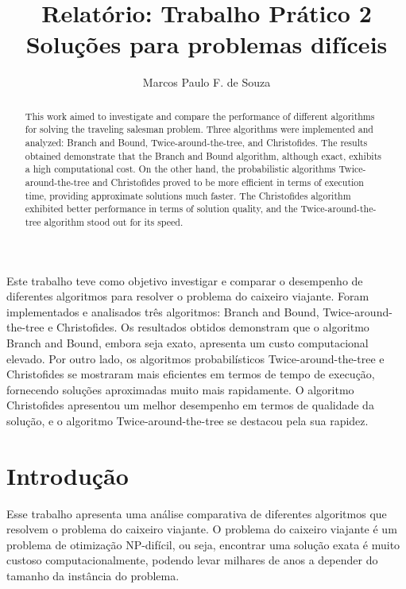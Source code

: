 \documentclass[12pt]{article}
\title{Relatório: Trabalho Prático 2\\ Soluções para problemas difíceis}
\author{ Marcos Paulo F. de Souza\inst{1} }
\begin{document}
 

\maketitle

\begin{abstract}
  This work aimed to investigate and compare the performance of different algorithms for solving the traveling salesman problem. Three algorithms were implemented and analyzed: Branch and Bound, Twice-around-the-tree, and Christofides. The results obtained demonstrate that the Branch and Bound algorithm, although exact, exhibits a high computational cost. On the other hand, the probabilistic algorithms Twice-around-the-tree and Christofides proved to be more efficient in terms of execution time, providing approximate solutions much faster. The Christofides algorithm exhibited better performance in terms of solution quality, and the Twice-around-the-tree algorithm stood out for its speed.
\end{abstract}
     
\begin{resumo} 
  Este trabalho teve como objetivo investigar e comparar o desempenho de diferentes algoritmos para resolver o problema do caixeiro viajante. Foram implementados e analisados três algoritmos: Branch and Bound, Twice-around-the-tree e Christofides. Os resultados obtidos demonstram que o algoritmo Branch and Bound, embora seja exato, apresenta um custo computacional elevado. Por outro lado, os algoritmos probabilísticos Twice-around-the-tree e Christofides se mostraram mais eficientes em termos de tempo de execução, fornecendo soluções aproximadas muito mais rapidamente. O algoritmo Christofides apresentou um melhor desempenho em termos de qualidade da solução, e o algoritmo Twice-around-the-tree se destacou pela sua rapidez.
\end{resumo}


\section{Introdução}

Esse trabalho apresenta uma análise comparativa de diferentes algoritmos que resolvem o problema do caixeiro viajante. O problema do caixeiro viajante é um problema de otimização NP-difícil, ou seja, encontrar uma solução exata é muito custoso computacionalmente, podendo levar milhares de anos a depender do tamanho da instância do problema. 
\end{document}
